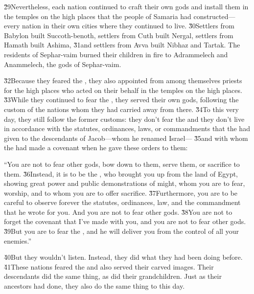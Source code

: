 \v{29}Nevertheless, each nation continued to craft their own gods and install them in the temples on the high places that the people of Samaria had constructed---every nation in their own cities where they continued to live. \v{30}Settlers from Babylon built Succoth-benoth, settlers from Cuth built Nergal, settlers from Hamath built Ashima, \v{31}and settlers from Avva built Nibhaz and Tartak. The residents of Sephar-vaim burned their children in fire to Adrammelech and Anammelech, the gods of Sephar-vaim.

\v{32}Because they feared the , they also appointed from among themselves priests for the high places who acted on their behalf in the temples on the high places. \v{33}While they continued to fear the , they served their own gods, following the custom of the nations whom they had carried away from there. \v{34}To this very day, they still follow the former customs: they don't fear the  and they don't live in accordance with the statutes, ordinances, laws, or commandments that the  had given to the descendants of Jacob---whom he renamed Israel--- \v{35}and with whom the  had made a covenant when he gave these orders to them:

\begin{poetry}
\poeml ``You are not to fear other gods, bow down to them, serve them, or sacrifice to them. \v{36}Instead, it is to be the , who brought you up from the land of Egypt, showing great power and public demonstrations of might, whom you are to fear, worship, and to whom you are to offer sacrifice. \v{37}Furthermore, you are to be careful to observe forever the statutes, ordinances, law, and the commandment that he wrote for you. And you are not to fear other gods. \v{38}You are not to forget the covenant that I've made with you, and you are not to fear other gods. \v{39}But you are to fear the , and he will deliver you from the control of all your enemies.''
\end{poetry}

\v{40}But they wouldn't listen. Instead, they did what they had been doing before. \v{41}These nations feared the  and also served their carved images. Their descendants did the same thing, as did their grandchildren. Just as their ancestors had done, they also do the same thing to this day.

